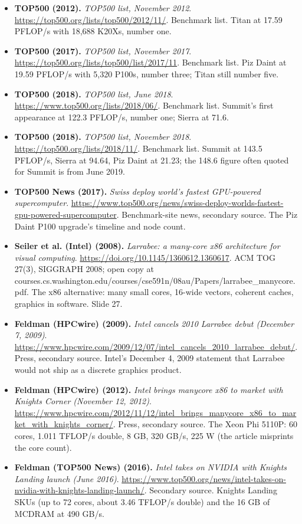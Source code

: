 \documentclass[11pt,letterpaper]{article}
\begin{document}
\begin{itemize}[leftmargin=1.2em,itemsep=3pt]
\item \textbf{TOP500 (2012).} \textit{TOP500 list, November 2012}. \url{https://top500.org/lists/top500/2012/11/}. Benchmark list. Titan at 17.59 PFLOP/s with 18,688 K20Xs, number one.
\item \textbf{TOP500 (2017).} \textit{TOP500 list, November 2017}. \url{https://top500.org/lists/top500/list/2017/11}. Benchmark list. Piz Daint at 19.59 PFLOP/s with 5,320 P100s, number three; Titan still number five.
\item \textbf{TOP500 (2018).} \textit{TOP500 list, June 2018}. \url{https://www.top500.org/lists/2018/06/}. Benchmark list. Summit's first appearance at 122.3 PFLOP/s, number one; Sierra at 71.6.
\item \textbf{TOP500 (2018).} \textit{TOP500 list, November 2018}. \url{https://top500.org/lists/2018/11/}. Benchmark list. Summit at 143.5 PFLOP/s, Sierra at 94.64, Piz Daint at 21.23; the 148.6 figure often quoted for Summit is from June 2019.
\item \textbf{TOP500 News (2017).} \textit{Swiss deploy world's fastest GPU-powered supercomputer}. \url{https://www.top500.org/news/swiss-deploy-worlds-fastest-gpu-powered-supercomputer}. Benchmark-site news, secondary source. The Piz Daint P100 upgrade's timeline and node count.
\item \textbf{Seiler et al. (Intel) (2008).} \textit{Larrabee: a many-core x86 architecture for visual computing}. \url{https://doi.org/10.1145/1360612.1360617}. ACM TOG 27(3), SIGGRAPH 2008; open copy at courses.cs.washington.edu/courses/cse591n/08au/Papers/larrabee\_manycore.pdf. The x86 alternative: many small cores, 16-wide vectors, coherent caches, graphics in software. Slide 27.
\item \textbf{Feldman (HPCwire) (2009).} \textit{Intel cancels 2010 Larrabee debut (December 7, 2009)}. \url{https://www.hpcwire.com/2009/12/07/intel_cancels_2010_larrabee_debut/}. Press, secondary source. Intel's December 4, 2009 statement that Larrabee would not ship as a discrete graphics product.
\item \textbf{Feldman (HPCwire) (2012).} \textit{Intel brings manycore x86 to market with Knights Corner (November 12, 2012)}. \url{https://www.hpcwire.com/2012/11/12/intel_brings_manycore_x86_to_market_with_knights_corner/}. Press, secondary source. The Xeon Phi 5110P: 60 cores, 1.011 TFLOP/s double, 8 GB, 320 GB/s, 225 W (the article misprints the core count).
\item \textbf{Feldman (TOP500 News) (2016).} \textit{Intel takes on NVIDIA with Knights Landing launch (June 2016)}. \url{https://www.top500.org/news/intel-takes-on-nvidia-with-knights-landing-launch/}. Secondary source. Knights Landing SKUs (up to 72 cores, about 3.46 TFLOP/s double) and the 16 GB of MCDRAM at 490 GB/s.

\end{itemize}
\end{document}
